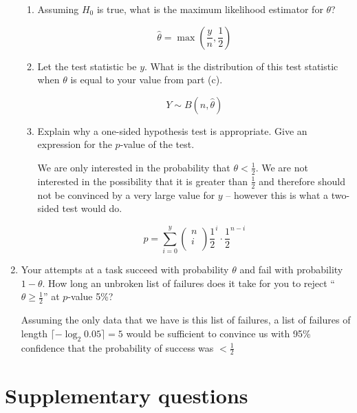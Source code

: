 \documentclass[10pt,\jkfside,a4paper]{article}
\begin{document}
\begin{enumerate}
\begin{enumerate}
\item Assuming $H_0$ is true, what is the maximum likelihood estimator for
$\theta$?

\[
\hat{\theta} = \max\left(\frac{y}{n}, \frac{1}{2}\right)
\]

\item Let the test statistic be $y$. What is the distribution of this test
statistic when $\theta$ is equal to your value from part (c).

\[
Y \sim B(n, \hat{\theta})
\]

\item Explain why a one-sided hypothesis test is appropriate. Give an
expression for the $p$-value of the test.

We are only interested in the probability that $\theta < \frac{1}{2}$. We
are not interested in the possibility that it is greater than $\frac{1}{2}$
and therefore should not be convinced by a very large value for $y$ --
however this is what a two-sided test would do.

\[
p = \sum^{y}_{i=0} \begin{pmatrix}
n \\ i \\
\end{pmatrix} \frac{1}{2}^i\cdot\frac{1}{2}^{n - i}
\]

\end{enumerate}

\item Your attempts at a task succeed with probability $\theta$ and fail
with probability $1 - \theta$. How long an unbroken list of failures does it
take for you to reject ``$\theta \geq \frac{1}{2}$'' at $p$-value 5\%?

Assuming the only data that we have is this list of failures, a list of
failures of length $\lceil-\log_2 0.05\rceil = 5$ would be sufficient to
convince us with 95\% confidence that the probability of success was $<
\frac{1}{2}$

\end{enumerate}

\section{Supplementary questions}
\end{document}

